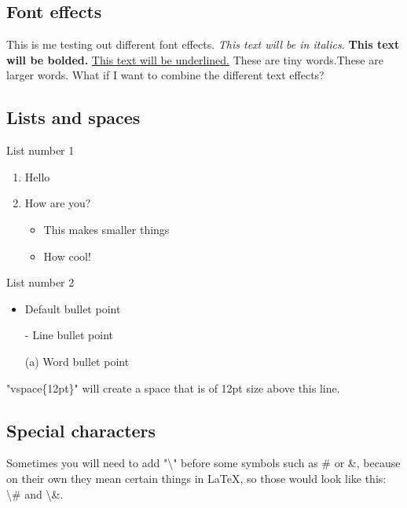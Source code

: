 \documentclass[a4paper, 12pt]{article}
\begin{document}
\subsection{Font effects}

This is me testing out different font effects. \textit{This text will be in italics.} \textbf{This text will be bolded.} \underline{This text will be underlined.} {\color{blue}{This text will be blue in colour.}} {\color{red}{This text will be red in colour.}} {\tiny These are tiny words.}{\large These are larger words.} What if I want to combine the different text effects? {}

\subsection{Lists and spaces}

List number 1

\begin{enumerate}
    \item Hello
    \item How are you?
    \begin{itemize}
        \item This makes smaller things
        \item How cool! 
    \end{itemize}
\end{enumerate}

\vspace{12pt}

List number 2

\begin{itemize}
    \item Default bullet point
    \item[-] Line bullet point
    \item[(a)] Word bullet point
\end{itemize}

\vspace{12pt}

"vspace\{12pt\}" will create a space that is of 12pt size above this line.

\subsection{Special characters}

Sometimes you will need to add "\textbackslash" before some symbols such as \# or \&, because on their own they mean certain things in \LaTeX, so those would look like this: \textbackslash\# and \textbackslash\&. 
\end{document}

